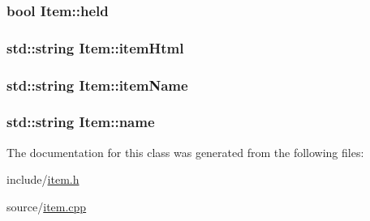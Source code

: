 \subsubsection[{\texorpdfstring{held}{held}}]{\setlength{\rightskip}{0pt plus 5cm}bool Item\+::held\hspace{0.3cm}{\ttfamily [private]}}\hypertarget{class_item_acb32fa26879eb794207306dd7f322f1f}{}\label{class_item_acb32fa26879eb794207306dd7f322f1f}
\subsubsection[{\texorpdfstring{item\+Html}{itemHtml}}]{\setlength{\rightskip}{0pt plus 5cm}std\+::string Item\+::item\+Html\hspace{0.3cm}{\ttfamily [private]}}\hypertarget{class_item_a324a6bcafab4ed84ad92860e061635e9}{}\label{class_item_a324a6bcafab4ed84ad92860e061635e9}
\subsubsection[{\texorpdfstring{item\+Name}{itemName}}]{\setlength{\rightskip}{0pt plus 5cm}std\+::string Item\+::item\+Name\hspace{0.3cm}{\ttfamily [private]}}\hypertarget{class_item_a17b15dc1e47ddba7e5c98476aeae98a6}{}\label{class_item_a17b15dc1e47ddba7e5c98476aeae98a6}
\subsubsection[{\texorpdfstring{name}{name}}]{\setlength{\rightskip}{0pt plus 5cm}std\+::string Item\+::name\hspace{0.3cm}{\ttfamily [private]}}\hypertarget{class_item_a342b7a351c9ae1c5430aa3ef65b670bd}{}\label{class_item_a342b7a351c9ae1c5430aa3ef65b670bd}


The documentation for this class was generated from the following files\+:\begin{DoxyCompactItemize}
\item 
include/\hyperlink{item_8h}{item.\+h}\item 
source/\hyperlink{item_8cpp}{item.\+cpp}\end{DoxyCompactItemize}
